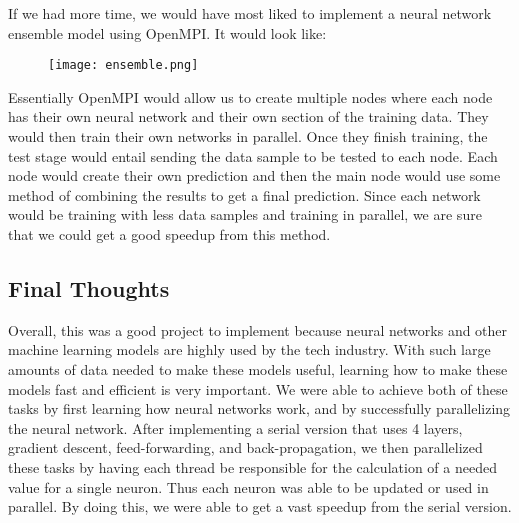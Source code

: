 \documentclass[twoside,twocolumn]{article}
\begin{document}
 If we had more time, we would have most liked to implement a neural network ensemble model using OpenMPI. It would look like:\\
 \begin{figure}[h]
     \centering
     \texttt{[image: ensemble.png]}
 \end{figure}
 
 Essentially OpenMPI would allow us to create multiple nodes where each node has their own neural network and their own section of the training data. They would then train their own networks in parallel. Once they finish training, the test stage would entail sending the data sample to be tested to each node. Each node would create their own prediction and then the main node would use some method of combining the results to get a final prediction. Since each network would be training with less data samples and training in parallel, we are sure that we could get a good speedup from this method. \\
 
 \subsection{Final Thoughts}
 Overall, this was a good project to implement because neural networks and other machine learning models are highly used by the tech industry. With such large amounts of data needed to make these models useful, learning how to make these models fast and efficient is very important. We were able to achieve both of these tasks by first learning how neural networks work, and by successfully parallelizing the neural network. After implementing a serial version that uses 4 layers, gradient descent, feed-forwarding, and back-propagation, we then parallelized these tasks by having each thread be responsible for the calculation of a needed value for a single neuron. Thus each neuron was able to be updated or used in parallel. By doing this, we were able to get a vast speedup from the serial version. 
 
\end{document}
